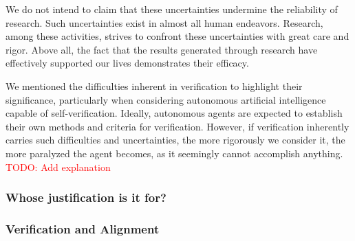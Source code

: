 \documentclass{book}
\begin{document}
We do not intend to claim that these uncertainties undermine the reliability of research. Such uncertainties exist in almost all human endeavors. Research, among these activities, strives to confront these uncertainties with great care and rigor. Above all, the fact that the results generated through research have effectively supported our lives demonstrates their efficacy.

We mentioned the difficulties inherent in verification to highlight their significance, particularly when considering autonomous artificial intelligence capable of self-verification. Ideally, autonomous agents are expected to establish their own methods and criteria for verification. However, if verification inherently carries such difficulties and uncertainties, the more rigorously we consider it, the more paralyzed the agent becomes, as it seemingly cannot accomplish anything. \textcolor{red}{TODO: Add explanation}





\subsubsection{Whose justification is it for?}

\subsubsection{Verification and Alignment}
\end{document}
